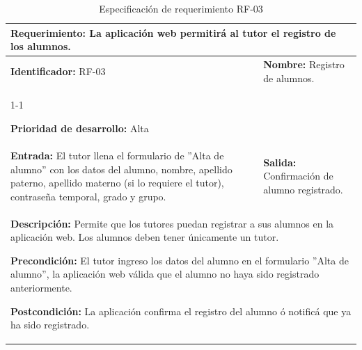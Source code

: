 \begin{table}[H]
\caption{Especificación de requerimiento RF-03}
\centering
\renewcommand{\arraystretch}{1.3}
\setlength{\tabcolsep}{6pt}

\begin{tabular}{|p{7cm}|p{8cm}|}
\hline

\multicolumn{2}{|p{15cm}|}{\textbf{Requerimiento:} La aplicación web permitirá al tutor el registro de los alumnos.} \\ \hline

\textbf{Identificador:} RF-03 &
\textbf{Nombre:} Registro de alumnos. \\ \cline{1-1}

\textbf{Prioridad de desarrollo:} Alta &
\multicolumn{1}{p{8cm}|}{} \\ \hline
\textbf{Entrada:} El tutor llena el formulario de ''Alta de alumno'' con los datos del alumno, nombre, apellido paterno, apellido materno (si lo requiere el tutor), contraseña temporal, grado y grupo. &
\textbf{Salida:} Confirmación de alumno registrado. \\ \hline

\multicolumn{2}{|p{15cm}|}{
\textbf{Descripción:} Permite que los tutores puedan registrar a sus alumnos en la aplicación web. Los alumnos deben tener únicamente un tutor.

\vspace{0.2cm}

\textbf{Precondición:} El tutor ingreso los datos del alumno en el formulario ''Alta de alumno'', la aplicación web válida que el alumno no haya sido registrado anteriormente.

\vspace{0.2cm}

\textbf{Postcondición:} La aplicación confirma el registro del alumno ó notificá que ya ha sido registrado.
} \\ \hline

\end{tabular}

\label{tab:rf4}

\end{table}


